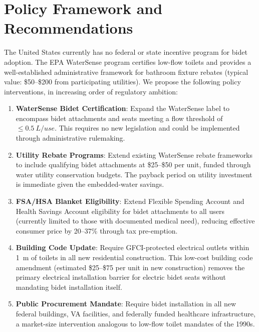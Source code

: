 \documentclass[aps,prfluids,reprint,amsmath,amssymb,floatfix]{revtex4-2}
\begin{document}
\section{Policy Framework and Recommendations}
\label{sec:policy}

The United States currently has no federal or state incentive program for
bidet adoption. The EPA WaterSense program certifies low-flow toilets and
provides a well-established administrative framework for bathroom fixture
rebates (typical value: \$50--\$200 from participating utilities). We propose
the following policy interventions, in increasing order of regulatory ambition:

\begin{enumerate}[leftmargin=*, label=\textbf{P\arabic*.}]
    \item \textbf{WaterSense Bidet Certification}: Expand the WaterSense
    label to encompass bidet attachments and seats meeting a flow threshold
    of $\leq\SI{0.5}{L\per use}$. This requires no new legislation and
    could be implemented through administrative rulemaking.
    \item \textbf{Utility Rebate Programs}: Extend existing WaterSense
    rebate frameworks to include qualifying bidet attachments at \$25--\$50
    per unit, funded through water utility conservation budgets. The payback
    period on utility investment is immediate given the embedded-water savings.
    \item \textbf{FSA/HSA Blanket Eligibility}: Extend Flexible Spending
    Account and Health Savings Account eligibility for bidet attachments
    to all users (currently limited to those with documented medical need),
    reducing effective consumer price by 20--37\% through tax pre-emption.
    \item \textbf{Building Code Update}: Require GFCI-protected electrical
    outlets within \SI{1}{m} of toilets in all new residential construction.
    This low-cost building code amendment (estimated \$25--\$75 per unit in
    new construction) removes the primary electrical installation barrier
    for electric bidet seats without mandating bidet installation itself.
    \item \textbf{Public Procurement Mandate}: Require bidet installation
    in all new federal buildings, VA facilities, and federally funded
    healthcare infrastructure, a market-size intervention analogous to
    low-flow toilet mandates of the 1990s.
\end{enumerate}
\end{document}
